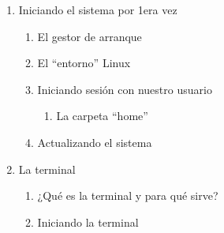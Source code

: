 \documentclass[12pt, letter-paper]{article}
\begin{document}
\begin{enumerate}
\item Iniciando el sistema por 1era vez
  \begin{enumerate}
  \item El gestor de arranque
  \item El ``entorno'' Linux
  \item Iniciando sesión con nuestro usuario
    \begin{enumerate}
    \item La carpeta ``home''
    \end{enumerate}
  \item Actualizando el sistema
  \end{enumerate}
  
\item La terminal
  \begin{enumerate}
  \item ¿Qué es la terminal y para qué sirve?
  \item Iniciando la terminal
  \end{enumerate}
  

\end{enumerate}
\end{document}
